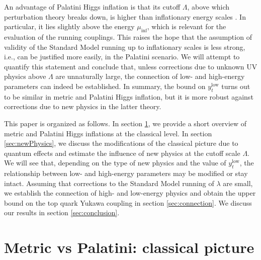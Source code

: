 \documentclass[a4paper,11pt]{article}
\newcommand*{\ie}{i.e., }
\begin{document}
An advantage of Palatini Higgs inflation is that its cutoff $\Lambda$, above which perturbation theory breaks down, is higher than inflationary energy scales \cite{1012.2900}. In particular, it lies slightly above the energy $\mu_{\text{inf}}$, which is relevant for the evaluation of the running couplings. This raises the hope that the assumption of validity of the Standard Model running up to inflationary scales  is less strong, \ie can be justified more easily, in the Palatini scenario. We will attempt to quantify this statement and conclude that, unless corrections due to unknown UV physics above $\Lambda$ are unnaturally large, the connection of low- and high-energy parameters can indeed be established.
In summary, the bound on $y_t^{\text{low}}$ turns out to be similar in metric and Palatini Higgs inflation, but it is more robust against corrections due to new physics in the latter theory.


This paper is organized as follows. In section \ref{sec:review}, we provide a short overview of metric and  Palatini Higgs inflations at the classical level. In section \ref{sec:newPhysics}, we discuss the modifications of the classical picture due to quantum effects and estimate the influence of new physics at the cutoff scale $\Lambda$. We will see that, depending on the type of new physics and the value of $y_t^{\text{low}}$, the relationship between low- and high-energy parameters may be modified or stay intact. Assuming that corrections to the Standard Model running of $\lambda$ are small, we establish the connection of high- and low-energy physics  and obtain the upper bound on the top quark Yukawa coupling in section \ref{sec:connection}. We discuss our results in section \ref{sec:conclusion}.


\section{Metric vs Palatini: classical picture}
\label{sec:review}
\end{document}
